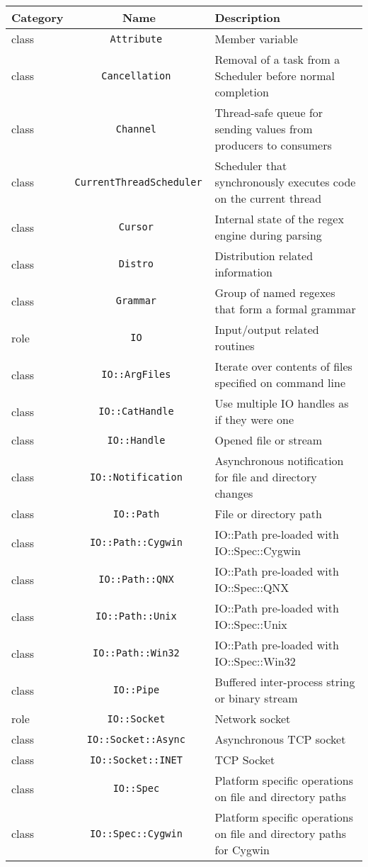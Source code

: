\documentclass[17pt,english]{extarticle}
\providecommand{\tabularnewline}{\\}
\begin{document}
\begin{longtable}{|>{\centering}p{}|c|>{\centering}p{}}
\hline 
Category &
Name &
Description\tabularnewline
\hline 
\hline 
class  &
\texttt{Attribute } &
Member variable\tabularnewline
\hline 
\hline 
class  &
\texttt{Cancellation } &
Removal of a task from a Scheduler before normal completion\tabularnewline
\hline 
\hline 
class  &
\texttt{Channel } &
Thread-safe queue for sending values from producers to consumers\tabularnewline
\hline 
\hline 
class  &
\texttt{CurrentThreadScheduler } &
Scheduler that synchronously executes code on the current thread\tabularnewline
\hline 
\hline 
class  &
\texttt{Cursor } &
Internal state of the regex engine during parsing\tabularnewline
\hline 
\hline 
class  &
\texttt{Distro } &
Distribution related information\tabularnewline
\hline 
\hline 
class  &
\texttt{Grammar } &
Group of named regexes that form a formal grammar\tabularnewline
\hline 
\hline 
role  &
\texttt{IO } &
Input/output related routines\tabularnewline
\hline 
\hline 
class  &
\texttt{IO::ArgFiles } &
Iterate over contents of files specified on command line\tabularnewline
\hline 
\hline 
class  &
\texttt{IO::CatHandle } &
Use multiple IO handles as if they were one\tabularnewline
\hline 
\hline 
class  &
\texttt{IO::Handle } &
Opened file or stream\tabularnewline
\hline 
\hline 
class  &
\texttt{IO::Notification } &
Asynchronous notification for file and directory changes\tabularnewline
\hline 
\hline 
class  &
\texttt{IO::Path } &
File or directory path\tabularnewline
\hline 
\hline 
class  &
\texttt{IO::Path::Cygwin } &
IO::Path pre-loaded with IO::Spec::Cygwin\tabularnewline
\hline 
\hline 
class  &
\texttt{IO::Path::QNX } &
IO::Path pre-loaded with IO::Spec::QNX\tabularnewline
\hline 
\hline 
class  &
\texttt{IO::Path::Unix } &
IO::Path pre-loaded with IO::Spec::Unix\tabularnewline
\hline 
\hline 
class  &
\texttt{IO::Path::Win32 } &
IO::Path pre-loaded with IO::Spec::Win32\tabularnewline
\hline 
\hline 
class  &
\texttt{IO::Pipe } &
Buffered inter-process string or binary stream\tabularnewline
\hline 
\hline 
role  &
\texttt{IO::Socket } &
Network socket\tabularnewline
\hline 
\hline 
class  &
\texttt{IO::Socket::Async } &
Asynchronous TCP socket\tabularnewline
\hline 
\hline 
class  &
\texttt{IO::Socket::INET } &
TCP Socket\tabularnewline
\hline 
\hline 
class  &
\texttt{IO::Spec } &
Platform specific operations on file and directory paths\tabularnewline
\hline 
\hline 
class  &
\texttt{IO::Spec::Cygwin } &
Platform specific operations on file and directory paths for Cygwin\tabularnewline

\end{longtable}
\end{document}
